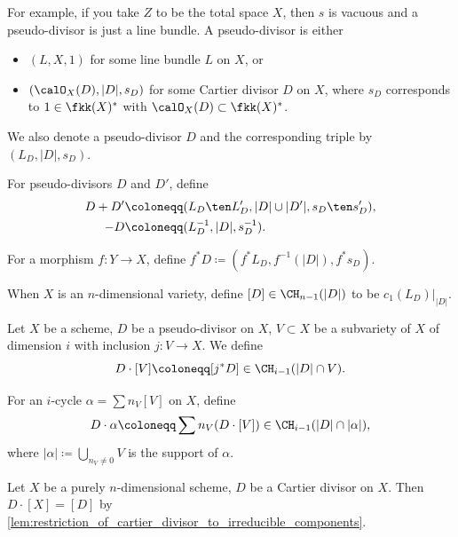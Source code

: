   For example, if you take $Z$ to be the total space $X$, then $s$ is vacuous and a pseudo-divisor is just a line bundle.
  \Yang{}
  A pseudo-divisor is either
  \begin{itemize}
    \item $(L,X,1)$ for some line bundle $L$ on $X$, or
    \item $(\calO_X (D), |D|, s_D)$ for some Cartier divisor $D$ on $X$, where $s_D$ corresponds to $1 \in \fkk(X)^*$ with $\calO_X (D) \subset \fkk(X)^*$.
  \end{itemize}
  We also denote a pseudo-divisor $D$ and the corresponding triple by $(L_D, |D|, s_D)$.

  \begin{definition}
    For pseudo-divisors $D$ and $D'$, define
    \begin{align*}
      D + D' &\coloneqq (L_D \ten L_D', |D| \cup |D'|, s_D \ten s_D'), \\
      - D &\coloneqq (L_D^{-1}, |D|, s_D^{-1}).
    \end{align*}

    For a morphism $f:Y \to X$, define $f^* D \coloneqq (f^* L_D, f^{-1} (|D|), f^* s_D)$.
  \end{definition}

  \begin{definition}
    When $X$ is an $n$-dimensional variety, define $[D] \in \CH_{n-1} (|D|)$ to be $c_1(L_D)|_{|D|}$.
  \end{definition}

  \begin{definition}
    Let $X$ be a scheme, $D$ be a pseudo-divisor on $X$, $V \subset X$ be a subvariety of $X$ of dimension $i$ with inclusion $j: V \to X$.
    We define 
    \[ D \cdot [V] \coloneqq [j^* D] \in \CH_{i-1} (|D| \cap V). \]

    For an $i$-cycle $\alpha = \sum n_V [V]$ on $X$, define 
    \[ D \cdot \alpha \coloneqq \sum n_V (D \cdot [V]) \in \CH_{i-1}(|D| \cap |\alpha|), \]
    where $|\alpha| \coloneqq \bigcup_{n_V \neq 0} V$ 
    is the support of $\alpha$.
  \end{definition}

  \begin{example}
    Let $X$ be a purely $n$-dimensional scheme, $D$ be a Cartier divisor on $X$.
    Then $D \cdot [X] = [D]$ by \cref{lem:restriction_of_cartier_divisor_to_irreducible_components}.
  \end{example}

